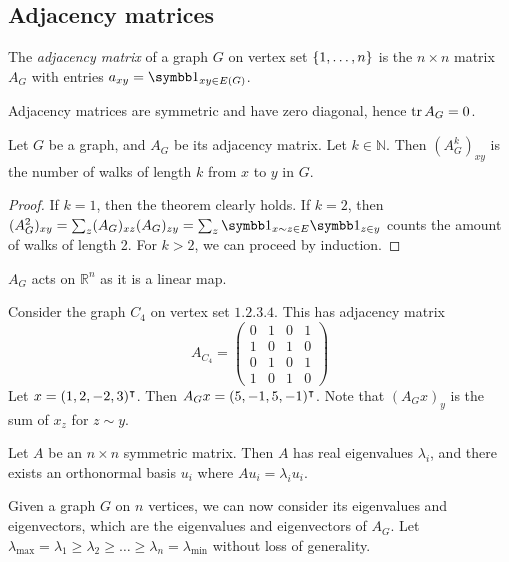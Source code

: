 \subsection{Adjacency matrices}
\begin{definition}
	The \emph{adjacency matrix} of a graph \( G \) on vertex set \( \qty{1, \dots, n} \) is the \( n \times n \) matrix \( A_G \) with entries \( a_{xy} = \symbb 1_{xy \in E(G)} \).
\end{definition}
\begin{remark}
	Adjacency matrices are symmetric and have zero diagonal, hence \( \tr A_G = 0 \).
\end{remark}
\begin{proposition}
	Let \( G \) be a graph, and \( A_G \) be its adjacency matrix.
	Let \( k \in \mathbb N \).
	Then \( (A_G^k)_{xy} \) is the number of walks of length \( k \) from \( x \) to \( y \) in \( G \).
\end{proposition}
\begin{proof}
	If \( k = 1 \), then the theorem clearly holds.
	If \( k = 2 \), then \( (A_G^2)_{xy} = \sum_z (A_G)_{xz} (A_G)_{zy} = \sum_z \symbb 1_{x \sim z \in E} \symbb 1_{z \in y} \) counts the amount of walks of length 2.
	For \( k > 2 \), we can proceed by induction.
\end{proof}
\( A_G \) acts on \( \mathbb R^n \) as it is a linear map.
\begin{example}
	Consider the graph \( C_4 \) on vertex set \( \qty{1, 2, 3, 4} \).
	This has adjacency matrix
	\[ A_{C_4} = \begin{pmatrix}
		0 & 1 & 0 & 1 \\
		1 & 0 & 1 & 0 \\
		0 & 1 & 0 & 1 \\
		1 & 0 & 1 & 0
	\end{pmatrix} \]
	Let \( x = (1, 2, -2, 3)^\intercal \).
	Then \( A_G x = (5, -1, 5, -1)^\intercal \).
	Note that \( (A_G x)_y \) is the sum of \( x_z \) for \( z \sim y \).
\end{example}
\begin{proposition}
	Let \( A \) be an \( n \times n \) symmetric matrix.
	Then \( A \) has real eigenvalues \( \lambda_i \), and there exists an orthonormal basis \( u_i \) where \( A u_i = \lambda_i u_i \).
\end{proposition}
Given a graph \( G \) on \( n \) vertices, we can now consider its eigenvalues and eigenvectors, which are the eigenvalues and eigenvectors of \( A_G \).
Let \( \lambda_{\mathrm{max}} = \lambda_1 \geq \lambda_2 \geq \dots \geq \lambda_n = \lambda_{\mathrm{min}} \) without loss of generality.
